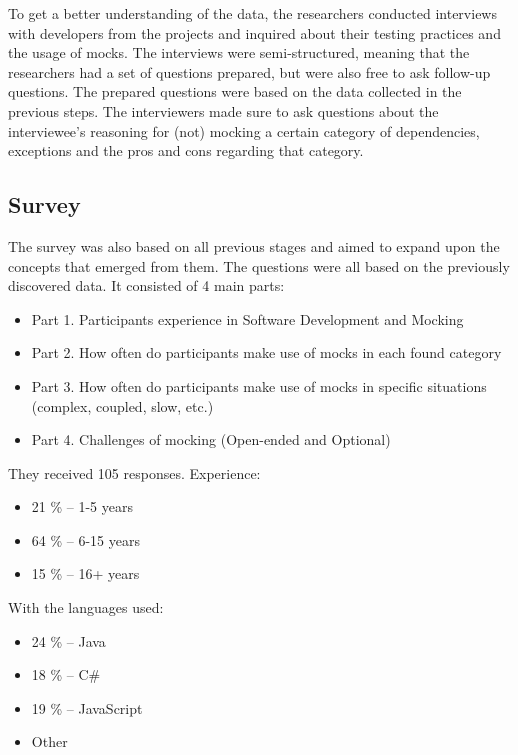 \documentclass[11pt,a4paper]{article}
\begin{document}
To get a better understanding of the data, the researchers conducted interviews with developers from the projects and inquired
about their testing practices and the usage of mocks. The interviews were semi-structured, meaning that the researchers had
a set of questions prepared, but were also free to ask follow-up questions. The prepared questions were based on the data 
collected in the previous steps. The interviewers made sure to ask questions about the interviewee's reasoning for (not) mocking
a certain category of dependencies, exceptions and the pros and cons regarding that category.

\pagebreak

\subsection{Survey}

The survey was also based on all previous stages and aimed to expand upon the concepts that emerged from them. The questions were
all based on the previously discovered data. It consisted of 4 main parts:

\begin{itemize}
    \item Part 1. Participants experience in Software Development and Mocking
    \item Part 2. How often do participants make use of mocks in each found category
    \item Part 3. How often do participants make use of mocks in specific situations (complex, coupled, slow, etc.)
    \item Part 4. Challenges of mocking (Open-ended and Optional)
\end{itemize}

They received 105 responses. Experience:

\begin{itemize}
    \item 21 \% -- 1-5 years
    \item 64 \% -- 6-15 years
    \item 15 \% -- 16+ years
\end{itemize}

With the languages used:

\begin{itemize}
    \item 24 \% -- Java
    \item 18 \% -- C\#
    \item 19 \% -- JavaScript
    \item Other
\end{itemize}
\end{document}

